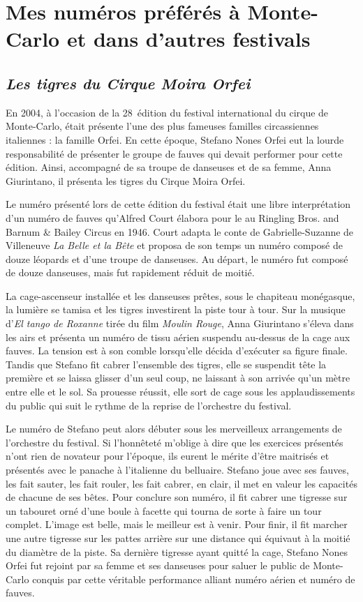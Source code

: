 \chapter{Mes numéros préférés à Monte-Carlo et dans d’autres festivals}

\section*{\textit{Les tigres du Cirque Moira Orfei}}
{}
\noindent
En 2004, à l’occasion de la 28\ieme~édition du festival international du cirque de Monte-Carlo, était présente l’une des plus fameuses familles circassiennes italiennes : la famille Orfei. En cette époque, Stefano Nones Orfei eut la lourde responsabilité de présenter le groupe de fauves qui devait performer pour cette édition. Ainsi, accompagné de sa troupe de danseuses et de sa femme, Anna Giurintano, il présenta les tigres du Cirque Moira Orfei.

Le numéro présenté lors de cette édition du festival était une libre interprétation d’un numéro de fauves qu’Alfred Court élabora pour le au Ringling Bros. and Barnum \& Bailey Circus en 1946. Court adapta le conte de Gabrielle-Suzanne de Villeneuve \textit{La Belle et la Bête} et proposa de son temps un numéro composé de douze léopards et d’une troupe de danseuses. Au départ, le numéro fut composé de douze danseuses, mais fut rapidement réduit de moitié.

La cage-ascenseur installée et les danseuses prêtes, sous le chapiteau monégasque, la lumière se tamisa et les tigres investirent la piste tour à tour. Sur la musique d’\textit{El tango de Roxanne} tirée du film \textit{Moulin Rouge}, Anna Giurintano s’éleva dans les airs et présenta un numéro de tissu aérien suspendu au-dessus de la cage aux fauves. La tension est à son comble lorsqu’elle décida d’exécuter sa figure finale. Tandis que Stefano fit cabrer l’ensemble des tigres, elle se suspendit tête la première et se laissa glisser d’un seul coup, ne laissant à son arrivée qu’un mètre entre elle et le sol. Sa prouesse réussit, elle sort de cage sous les applaudissements du public qui suit le rythme de la reprise de l’orchestre du festival.

Le numéro de Stefano peut alors débuter sous les merveilleux arrangements de l’orchestre du festival. Si l’honnêteté m’oblige à dire que les exercices présentés n’ont rien de novateur pour l’époque, ils eurent le mérite d’être maitrisés et présentés avec le panache à l’italienne du belluaire. Stefano joue avec ses fauves, les fait sauter, les fait rouler, les fait cabrer, en clair, il met en valeur les capacités de chacune de ses bêtes. Pour conclure son numéro, il fit cabrer une tigresse sur un tabouret orné d'une boule à facette qui tourna de sorte à faire un tour complet. L’image est belle, mais le meilleur est à venir. Pour finir, il fit marcher une autre tigresse sur les pattes arrière sur une distance qui équivaut à la moitié du diamètre de la piste. Sa dernière tigresse ayant quitté la cage, Stefano Nones Orfei fut rejoint par sa femme et ses danseuses pour saluer le public de Monte-Carlo conquis par cette véritable performance alliant numéro aérien et numéro de fauves.

